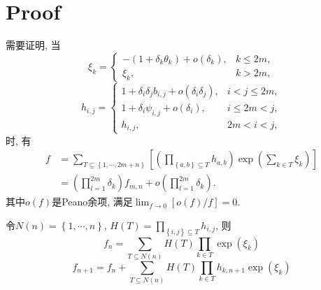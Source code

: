 \documentclass{article}
\newcommand{\sbrace}[1]{\left(#1\right)}
\newcommand{\mbrace}[1]{\left[#1\right]}
\newcommand{\bbrace}[1]{\left\{#1\right\}}
\begin{document}
\section{Proof}
需要证明, 当
\begin{equation}
\xi_k=\left\{\begin{array}{ll}
-\sbrace{1+\delta_k \theta_k}+o\sbrace{\delta_k}, & k\le 2m, \\ 
\xi_k, & k>2m,   
\end{array}\right.
\end{equation}
\begin{equation}
h_{i,j}=\left\{\begin{array}{ll}
1+\delta_i \delta_j b_{i,j}+o\sbrace{\delta_i \delta_j}, & i<j\le 2m, \\
1+\delta_i \psi_{i,j}+o\sbrace{\delta_i}, & i\le 2m < j , \\
h_{i,j}, & 2m<i<j,
\end{array}\right.
\end{equation}
时, 有
\begin{equation}
\begin{aligned}
f&=\sum_{T\subseteq \bbrace{1,\cdots,2m+n}}{\mbrace{
  \sbrace{\prod_{\bbrace{a,b}\subseteq T}{h_{a,b}}}
  \exp\sbrace{\sum_{k\in T}{\xi_k}} 
}} \\ 
&=\sbrace{\prod_{l=1}^{2m}{\delta_k}}f_{m,n}+o\sbrace{\prod_{l=1}^{2m}{\delta_k}}.
\end{aligned}
\end{equation}
其中$o(f)$是Peano余项, 满足$\lim_{f\rightarrow 0}[o(f)/f]=0$.

令$N(n)=\bbrace{1,\cdots,n}$, $H(T)=\prod_{\bbrace{i,j}\subseteq T}{h_{i,j}}$, 则
\begin{equation}
  f_n=\sum_{T \subseteq N(n)}{H(T)\prod_{k \in T}{\exp\sbrace{\xi_k}}}
\end{equation}
\begin{equation}
  f_{n+1}=f_n+\sum_{T\subseteq N(n)}{H(T)\prod_{k\in T}{h_{k,n+1}\exp(\xi_k)}}
\end{equation}
\end{document}
